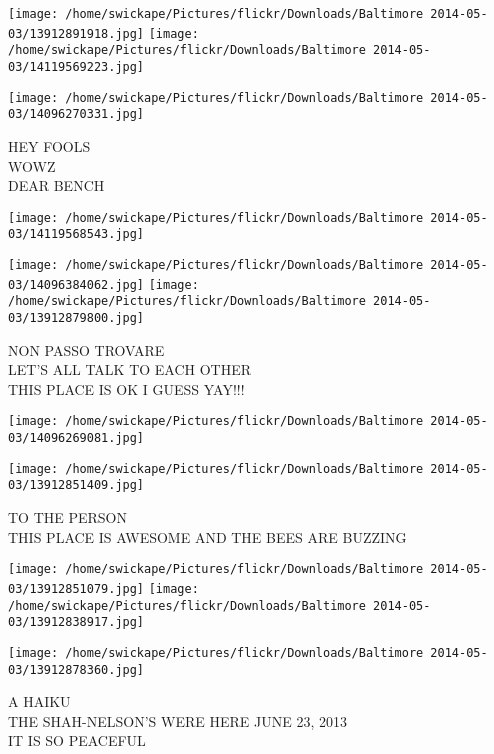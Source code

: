 \documentclass[10pt,letterpaper]{article}
\begin{document}
\texttt{[image: /home/swickape/Pictures/flickr/Downloads/Baltimore 2014-05-03/13912891918.jpg]}
\texttt{[image: /home/swickape/Pictures/flickr/Downloads/Baltimore 2014-05-03/14119569223.jpg]}

\vspace{0.25in}
\texttt{[image: /home/swickape/Pictures/flickr/Downloads/Baltimore 2014-05-03/14096270331.jpg]}

HEY FOOLS\\
WOWZ\\
DEAR BENCH\\
\pagebreak

\texttt{[image: /home/swickape/Pictures/flickr/Downloads/Baltimore 2014-05-03/14119568543.jpg]}

\vspace{0.25in}
\texttt{[image: /home/swickape/Pictures/flickr/Downloads/Baltimore 2014-05-03/14096384062.jpg]}
\texttt{[image: /home/swickape/Pictures/flickr/Downloads/Baltimore 2014-05-03/13912879800.jpg]}

NON PASSO TROVARE\\
LET'S ALL TALK TO EACH OTHER\\
THIS PLACE IS OK I GUESS YAY!!!\\
\pagebreak

\texttt{[image: /home/swickape/Pictures/flickr/Downloads/Baltimore 2014-05-03/14096269081.jpg]}

\vspace{0.25in}
\texttt{[image: /home/swickape/Pictures/flickr/Downloads/Baltimore 2014-05-03/13912851409.jpg]}

TO THE PERSON\\
THIS PLACE IS AWESOME AND THE BEES ARE BUZZING\\
\pagebreak

\texttt{[image: /home/swickape/Pictures/flickr/Downloads/Baltimore 2014-05-03/13912851079.jpg]}
\texttt{[image: /home/swickape/Pictures/flickr/Downloads/Baltimore 2014-05-03/13912838917.jpg]}

\vspace{0.25in}
\texttt{[image: /home/swickape/Pictures/flickr/Downloads/Baltimore 2014-05-03/13912878360.jpg]}

A HAIKU\\
THE SHAH{-}NELSON'S WERE HERE JUNE 23, 2013\\
IT IS SO PEACEFUL\\
\pagebreak
\end{document}

